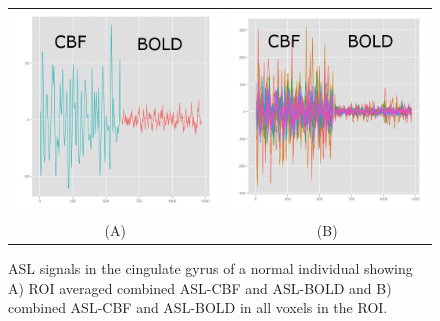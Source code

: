 \documentclass{llncs}
\begin{document}
\begin{figure}[tb]
\begin{center}
\begin{tabular}{ c c }
\includegraphics[width=0.30\linewidth]{roi_signals2.png} & \includegraphics[width=0.30\linewidth]{all_signals2.png} \\
(A) & (B)
\end{tabular}
\caption{ ASL signals in the cingulate gyrus of a normal individual showing A) ROI averaged combined ASL-CBF and ASL-BOLD and B) combined ASL-CBF and ASL-BOLD in all voxels in the ROI.}
\label{fig:signals}
\end{center}
\end{figure}
\end{document}

